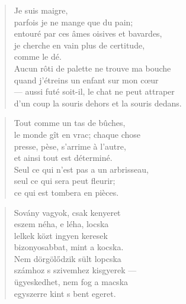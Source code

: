 \begin{verse}
  Je suis maigre, \\
  parfois je ne mange que du pain; \\
  entouré par ces âmes oisives et bavardes, \\
  je cherche en vain plus de certitude, \\
  comme le dé. \\
  Aucun rôti de palette ne trouve ma bouche \\
  quand j'étreins un enfant sur mon cœur \\
  --- aussi futé soit-il, le chat ne peut attraper \\
  d'un coup la souris dehors et la souris dedans.
\end{verse}

\bigskip



\begin{verse}
  Tout comme un tas de bûches, \\
  le monde gît en vrac; chaque chose \\
  presse, pèse, s'arrime à l'autre, \\
  et ainsi tout est déterminé. \\
  Seul ce qui n'est pas a un arbrisseau, \\
  seul ce qui sera peut fleurir; \\
  ce qui est tombera en pièces.
\end{verse}

\newpage


\vspace*{-15mm}
\centeredornament



\begin{verse}
  Sovány vagyok, csak kenyeret \\
  eszem néha, e léha, locska \\
  lelkek közt ingyen keresek \\
  bizonyosabbat, mint a kocska. \\
  Nem dörgölődzik sült lopcska \\
  számhoz s szivemhez kisgyerek --- \\
  ügyeskedhet, nem fog a macska \\
  egyszerre kint s bent egeret.
\end{verse}


